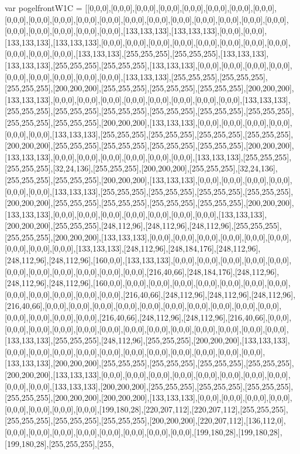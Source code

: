 var pogelfrontW1C = [[0,0,0],[0,0,0],[0,0,0],[0,0,0],[0,0,0],[0,0,0],[0,0,0],[0,0,0],[0,0,0],[0,0,0],[0,0,0],[0,0,0],[0,0,0],[0,0,0],[0,0,0],[0,0,0],[0,0,0],[0,0,0],[0,0,0],[0,0,0],[0,0,0],[0,0,0],[0,0,0],[0,0,0],[0,0,0],[133,133,133],[133,133,133],[0,0,0],[0,0,0],[133,133,133],[133,133,133],[0,0,0],[0,0,0],[0,0,0],[0,0,0],[0,0,0],[0,0,0],[0,0,0],[0,0,0],[0,0,0],[0,0,0],[0,0,0],[133,133,133],[255,255,255],[255,255,255],[133,133,133],[133,133,133],[255,255,255],[255,255,255],[133,133,133],[0,0,0],[0,0,0],[0,0,0],[0,0,0],[0,0,0],[0,0,0],[0,0,0],[0,0,0],[0,0,0],[133,133,133],[255,255,255],[255,255,255],[255,255,255],[200,200,200],[255,255,255],[255,255,255],[255,255,255],[200,200,200],[133,133,133],[0,0,0],[0,0,0],[0,0,0],[0,0,0],[0,0,0],[0,0,0],[0,0,0],[0,0,0],[133,133,133],[255,255,255],[255,255,255],[255,255,255],[255,255,255],[255,255,255],[255,255,255],[255,255,255],[255,255,255],[200,200,200],[133,133,133],[0,0,0],[0,0,0],[0,0,0],[0,0,0],[0,0,0],[0,0,0],[133,133,133],[255,255,255],[255,255,255],[255,255,255],[255,255,255],[200,200,200],[255,255,255],[255,255,255],[255,255,255],[255,255,255],[200,200,200],[133,133,133],[0,0,0],[0,0,0],[0,0,0],[0,0,0],[0,0,0],[0,0,0],[133,133,133],[255,255,255],[255,255,255],[32,24,136],[255,255,255],[200,200,200],[255,255,255],[32,24,136],[255,255,255],[255,255,255],[200,200,200],[133,133,133],[0,0,0],[0,0,0],[0,0,0],[0,0,0],[0,0,0],[0,0,0],[133,133,133],[255,255,255],[255,255,255],[255,255,255],[255,255,255],[200,200,200],[255,255,255],[255,255,255],[255,255,255],[255,255,255],[200,200,200],[133,133,133],[0,0,0],[0,0,0],[0,0,0],[0,0,0],[0,0,0],[0,0,0],[0,0,0],[133,133,133],[200,200,200],[255,255,255],[248,112,96],[248,112,96],[248,112,96],[255,255,255],[255,255,255],[200,200,200],[133,133,133],[0,0,0],[0,0,0],[0,0,0],[0,0,0],[0,0,0],[0,0,0],[0,0,0],[0,0,0],[0,0,0],[133,133,133],[248,112,96],[248,184,176],[248,112,96],[248,112,96],[248,112,96],[160,0,0],[133,133,133],[0,0,0],[0,0,0],[0,0,0],[0,0,0],[0,0,0],[0,0,0],[0,0,0],[0,0,0],[0,0,0],[0,0,0],[0,0,0],[216,40,66],[248,184,176],[248,112,96],[248,112,96],[248,112,96],[160,0,0],[0,0,0],[0,0,0],[0,0,0],[0,0,0],[0,0,0],[0,0,0],[0,0,0],[0,0,0],[0,0,0],[0,0,0],[0,0,0],[0,0,0],[216,40,66],[248,112,96],[248,112,96],[248,112,96],[216,40,66],[0,0,0],[0,0,0],[0,0,0],[0,0,0],[0,0,0],[0,0,0],[0,0,0],[0,0,0],[0,0,0],[0,0,0],[0,0,0],[0,0,0],[0,0,0],[0,0,0],[216,40,66],[248,112,96],[248,112,96],[216,40,66],[0,0,0],[0,0,0],[0,0,0],[0,0,0],[0,0,0],[0,0,0],[0,0,0],[0,0,0],[0,0,0],[0,0,0],[0,0,0],[0,0,0],[0,0,0],[133,133,133],[255,255,255],[248,112,96],[255,255,255],[200,200,200],[133,133,133],[0,0,0],[0,0,0],[0,0,0],[0,0,0],[0,0,0],[0,0,0],[0,0,0],[0,0,0],[0,0,0],[0,0,0],[0,0,0],[133,133,133],[200,200,200],[255,255,255],[255,255,255],[255,255,255],[255,255,255],[200,200,200],[133,133,133],[0,0,0],[0,0,0],[0,0,0],[0,0,0],[0,0,0],[0,0,0],[0,0,0],[0,0,0],[0,0,0],[0,0,0],[133,133,133],[200,200,200],[255,255,255],[255,255,255],[255,255,255],[255,255,255],[200,200,200],[200,200,200],[133,133,133],[0,0,0],[0,0,0],[0,0,0],[0,0,0],[0,0,0],[0,0,0],[0,0,0],[0,0,0],[199,180,28],[220,207,112],[220,207,112],[255,255,255],[255,255,255],[255,255,255],[255,255,255],[200,200,200],[220,207,112],[136,112,0],[0,0,0],[0,0,0],[0,0,0],[0,0,0],[0,0,0],[0,0,0],[0,0,0],[0,0,0],[199,180,28],[199,180,28],[199,180,28],[255,255,255],[255,